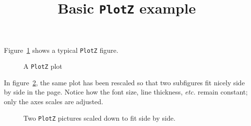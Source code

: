 \documentclass{article}
\title{Basic \texttt{PlotZ} example}
\date{}
\author{}
\begin{document}
\maketitle

Figure~\ref{fig:plotz} shows a typical \texttt{PlotZ} figure.

\begin{figure}[h]
  \centering
  \caption{A \texttt{PlotZ} plot}
  \label{fig:plotz}
\end{figure}

\vfill

In figure~\ref{fig:plotz*}, the same plot has been rescaled so that two
subfigures fit nicely side by side in the page. Notice how the font size, line
thickness, \textit{etc.} remain constant; only the axes scales are adjusted.

\begin{figure}[h]
  \centering
  \hfill%
  \caption{Two \texttt{PlotZ} pictures scaled down to fit side by side.}
  \label{fig:plotz*}
\end{figure}
\end{document}
